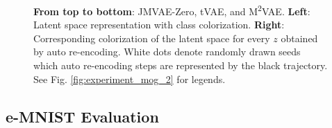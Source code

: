 \begin{figure}[h]
	\def\svgwidth{\textwidth}
	\tiny
	
	\caption{\textbf{From top to bottom}: JMVAE-Zero, tVAE, and M\textsuperscript{2}VAE. \textbf{Left}: Latent space representation with class colorization. \textbf{Right}: Corresponding colorization of the latent space for every $z$ obtained by auto re-encoding. White dots denote randomly drawn seeds which auto re-encoding steps are represented by the black trajectory. See Fig. \ref{fig:experiment_mog_2} for legends.}
	\label{fig:attractor}
\end{figure}


\subsection{e-MNIST Evaluation}


